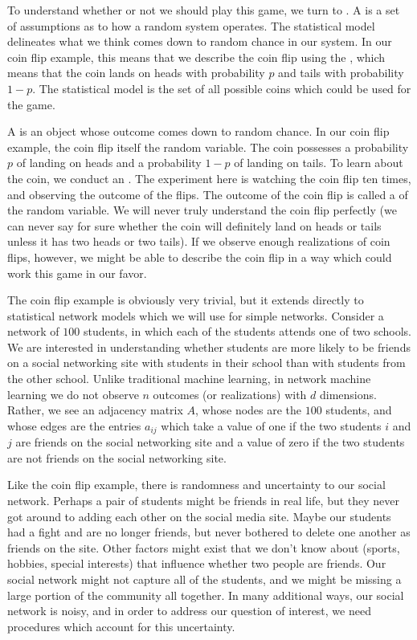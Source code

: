 \documentclass[letterpaper,10pt,english]{jupyterBook}
\begin{document}
\sphinxAtStartPar
To understand whether or not we should play this game, we turn to . A  is a set of assumptions as to how a random system operates. The statistical model delineates what we think comes down to random chance in our system. In our coin flip example, this means that we describe the coin flip using the , which means that the coin lands on heads with probability \(p\) and tails with probability \(1-p\). The statistical model is the set of all possible coins which could be used for the game.

\sphinxAtStartPar
A  is an object whose outcome comes down to random chance. In our coin flip example, the coin flip itself  the random variable. The coin possesses a probability \(p\) of landing on heads and a probability \(1-p\) of landing on tails. To learn about the coin, we conduct an . The experiment here is watching the coin flip ten times, and observing the outcome of the flips. The outcome of the coin flip is called a  of the random variable. We will never truly understand the coin flip perfectly (we can never say for sure whether the coin will definitely land on heads or tails unless it has two heads or two tails). If we observe enough realizations of coin flips, however, we might be able to describe the coin flip in a way which could work this game in our favor.

\sphinxAtStartPar
The coin flip example is obviously very trivial, but it extends directly to statistical network models which we will use for simple networks. Consider a network of \(100\) students, in which each of the students attends one of two schools. We are interested in understanding whether students are more likely to be friends on a social networking site with students in their school than with students from the other school. Unlike traditional machine learning, in network machine learning we do not observe \(n\) outcomes (or realizations) with \(d\) dimensions. Rather, we see an adjacency matrix \(A\), whose nodes are the \(100\) students, and whose edges are the entries \(a_{ij}\) which take a value of one if the two students \(i\) and \(j\) are friends on the social networking site and a value of zero if the two students are not friends on the social networking site.

\sphinxAtStartPar
Like the coin flip example, there is randomness and uncertainty to our social network. Perhaps a pair of students might be friends in real life, but they never got around to adding each other on the social media site. Maybe our students had a fight and are no longer friends, but never bothered to delete one another as friends on the site. Other factors might exist that we don’t know about (sports, hobbies, special interests) that influence whether two people are friends. Our social network might not capture all of the students, and we might be missing a large portion of the community all together. In many additional ways, our social network is noisy, and in order to address our question of interest, we need procedures which account for this uncertainty.
\end{document}
